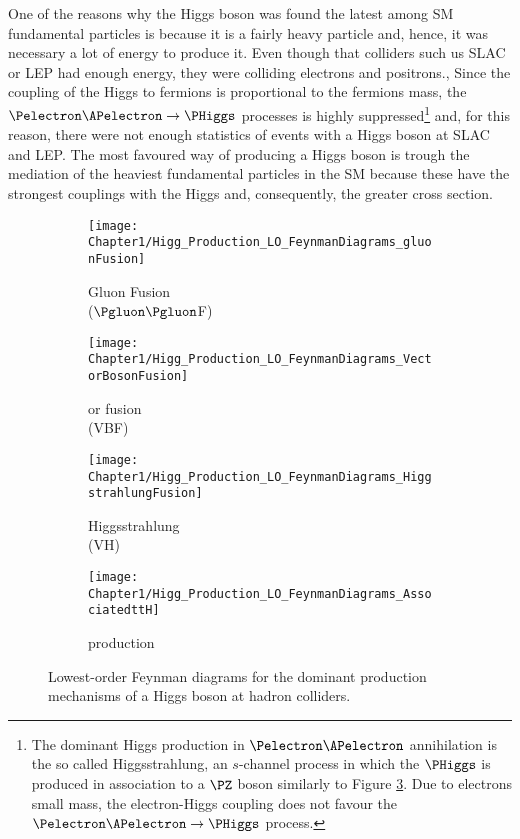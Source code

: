 One of the reasons why the Higgs boson was found the latest  among SM fundamental particles is because it is a fairly heavy particle and, hence, it was necessary a lot of energy to produce it. Even though
that colliders such us SLAC or LEP had enough energy, they were colliding electrons and positrons.,
Since the coupling of the Higgs to fermions is proportional to the fermions mass, 
the $\Pelectron \APelectron \rightarrow \PHiggs$ processes 
is highly suppressed\footnote{The dominant Higgs production in  
$\Pelectron \APelectron$ annihilation is the so called Higgsstrahlung, 
an $s$-channel process in which the $\PHiggs$ is produced in association 
to a $\PZ$ boson similarly to Figure \ref{fig:Chap1:Higgs:LOFeynman_C}. Due to electrons 
small mass, the electron-Higgs coupling does not favour the 
$\Pelectron \APelectron \rightarrow \PHiggs$ process.}  and, for this reason, there 
were not enough  statistics of events with a Higgs boson at SLAC and LEP. The most favoured 
way of producing a Higgs boson is trough the mediation of the heaviest 
fundamental particles in the SM because these have the strongest couplings 
with the Higgs and, consequently, the greater cross section.
\begin{figure}
\centering
\begin{subfigure}{.23\textwidth}
  \centering
  \texttt{[image: Chapter1/Higg\_Production\_LO\_FeynmanDiagrams\_gluonFusion]}
  \caption{Gluon Fusion\\ ($\Pgluon \Pgluon$F)}
  \label{fig:Chap1:Higgs:LOFeynman_A}
\end{subfigure}%
\begin{subfigure}{.23\textwidth}
  \centering
  \texttt{[image: Chapter1/Higg\_Production\_LO\_FeynmanDiagrams\_VectorBosonFusion]}
  \caption{\PW or \PZ fusion\\ (VBF)}
  \label{fig:Chap1:Higgs:LOFeynman_B}
\end{subfigure}%
\begin{subfigure}{.23\textwidth}
  \centering
  \texttt{[image: Chapter1/Higg\_Production\_LO\_FeynmanDiagrams\_HiggstrahlungFusion]}
  \caption{Higgsstrahlung\\ (VH)}
  \label{fig:Chap1:Higgs:LOFeynman_C}
\end{subfigure}%
\begin{subfigure}{.23\textwidth}
  \centering
  \texttt{[image: Chapter1/Higg\_Production\_LO\_FeynmanDiagrams\_AssociatedttH]}
  \caption{\ttH production}
  \label{fig:Chap1:Higgs:LOFeynman_D}
\end{subfigure}%
\caption{Lowest-order Feynman diagrams for the dominant production mechanisms of a Higgs boson at hadron colliders.}
\label{fig:Chap1:Higgs:LOFeynman}
\end{figure}

